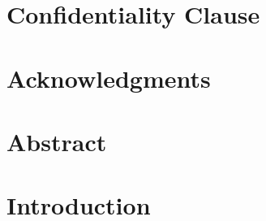 \documentclass[11pt, twoside]{article}
\numberwithin{equation}{section}
\numberwithin{table}{section}
\numberwithin{figure}{section}
\begin{document}
\thispagestyle{empty}	


\newpage
\null\thispagestyle{empty}
\newpage



\thispagestyle{empty}
\section*{Confidentiality Clause}

\clearpage

\newpage
\null\thispagestyle{empty}




\newpage
\thispagestyle{empty}
\section*{Acknowledgments}

\newpage
\null\thispagestyle{empty}
\newpage



\newpage
\thispagestyle{empty}
\section*{Abstract}

\newpage
\null\thispagestyle{empty}
\newpage


	
\fancyhf{}
\fancyhead[LO,RE]{\footnotesize \nouppercase{\leftmark}}
\thispagestyle{empty}
\tableofcontents
\newpage 
\cleardoublepage



\setcounter{page}{1} 





\fancyhf{}
\fancyhead[LO]{\footnotesize \nouppercase{\rightmark}}
\fancyhead[RE]{\footnotesize \nouppercase{\leftmark}}
\fancyhead[RO,LE]{\footnotesize \thepage}

\thispagestyle{plain}
\section{Introduction} \label{sec:introduction}

\end{document}
